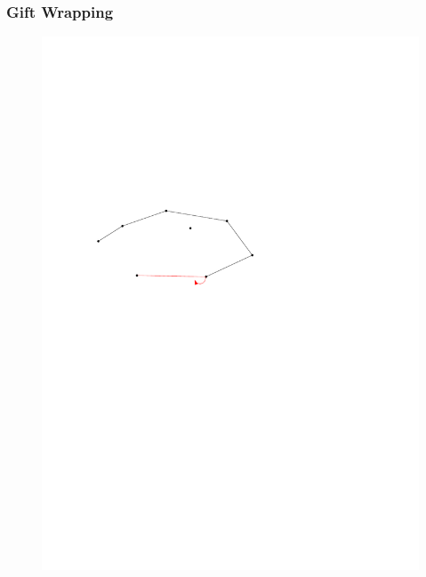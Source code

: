 \begin{frame}
	\frametitle{{Gift Wrapping}}
\begin{figure}[htbp]
	\begin{center}
  	\includegraphics[width=.8\linewidth]{bilder/giftwrap6}
	\end{center}
\end{figure}
\end{frame}

